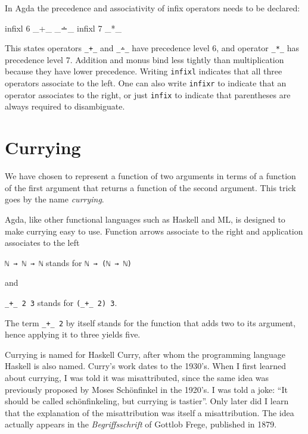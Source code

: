 In Agda the precedence and associativity of infix operators needs to be
declared:

\begin{fence}
\begin{code}
infixl 6  _+_  _∸_
infixl 7  _*_
\end{code}
\end{fence}

This states operators \texttt{\_+\_} and \texttt{\_∸\_} have precedence
level 6, and operator \texttt{\_*\_} has precedence level 7. Addition
and monus bind less tightly than multiplication because they have lower
precedence. Writing \texttt{infixl} indicates that all three operators
associate to the left. One can also write \texttt{infixr} to indicate
that an operator associates to the right, or just \texttt{infix} to
indicate that parentheses are always required to disambiguate.

\hypertarget{currying}{%
\section{Currying}\label{currying}}

We have chosen to represent a function of two arguments in terms of a
function of the first argument that returns a function of the second
argument. This trick goes by the name \emph{currying}.

Agda, like other functional languages such as Haskell and ML, is
designed to make currying easy to use. Function arrows associate to the
right and application associates to the left

\texttt{ℕ\ →\ ℕ\ →\ ℕ} stands for \texttt{ℕ\ →\ (ℕ\ →\ ℕ)}

and

\texttt{\_+\_\ 2\ 3} stands for \texttt{(\_+\_\ 2)\ 3}.

The term \texttt{\_+\_\ 2} by itself stands for the function that adds
two to its argument, hence applying it to three yields five.

Currying is named for Haskell Curry, after whom the programming language
Haskell is also named. Curry's work dates to the 1930's. When I first
learned about currying, I was told it was misattributed, since the same
idea was previously proposed by Moses Schönfinkel in the 1920's. I was
told a joke: ``It should be called schönfinkeling, but currying is
tastier''. Only later did I learn that the explanation of the
misattribution was itself a misattribution. The idea actually appears in
the \emph{Begriffsschrift} of Gottlob Frege, published in 1879.

